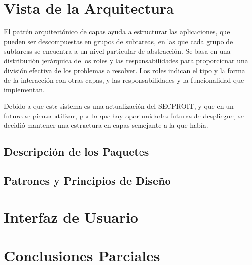 
\section{Vista de la Arquitectura}
El patrón arquitectónico de capas ayuda a estructurar las aplicaciones, que pueden ser descompuestas en grupos de subtareas, en las que cada grupo de subtareas se encuentra a un nivel particular de abstracción. Se basa en una distribución jerárquica de los roles y las responsabilidades para proporcionar una división efectiva de los problemas a resolver. Los roles indican el tipo y la forma de la interacción con otras capas, y las responsabilidades y la funcionalidad que implementan.

Debido a que este sistema es una actualización del SECPROIT, y que en un futuro se piensa utilizar, por lo que hay oportunidades futuras de despliegue, se decidió mantener una estructura en capas semejante a la que había.

\subsection{Descripción de los Paquetes}

\subsection{Patrones y Principios de Diseño}


\section{Interfaz de Usuario}


\section{Conclusiones Parciales}